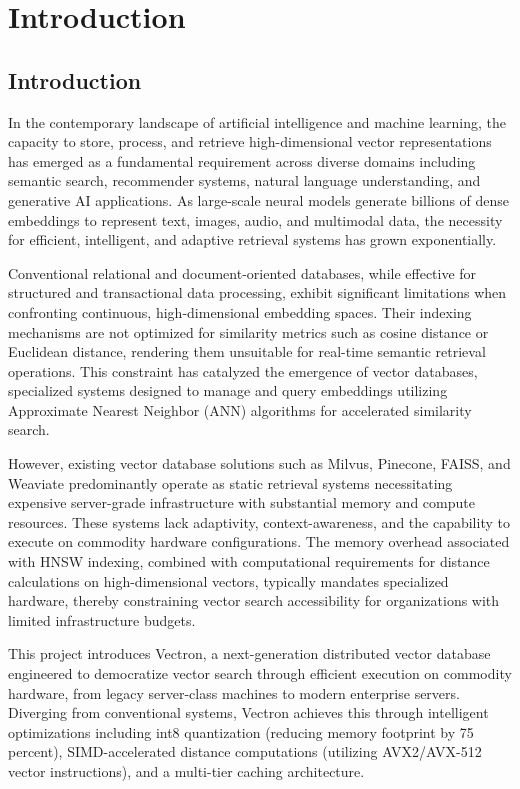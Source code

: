 \chapter{Introduction}

\section{Introduction}

In the contemporary landscape of artificial intelligence and machine learning, the capacity to store, process, and retrieve high-dimensional vector representations has emerged as a fundamental requirement across diverse domains including semantic search, recommender systems, natural language understanding, and generative AI applications. As large-scale neural models generate billions of dense embeddings to represent text, images, audio, and multimodal data, the necessity for efficient, intelligent, and adaptive retrieval systems has grown exponentially.

Conventional relational and document-oriented databases, while effective for structured and transactional data processing, exhibit significant limitations when confronting continuous, high-dimensional embedding spaces. Their indexing mechanisms are not optimized for similarity metrics such as cosine distance or Euclidean distance, rendering them unsuitable for real-time semantic retrieval operations. This constraint has catalyzed the emergence of vector databases, specialized systems designed to manage and query embeddings utilizing Approximate Nearest Neighbor (ANN) algorithms for accelerated similarity search.

However, existing vector database solutions such as Milvus, Pinecone, FAISS, and Weaviate predominantly operate as static retrieval systems necessitating expensive server-grade infrastructure with substantial memory and compute resources. These systems lack adaptivity, context-awareness, and the capability to execute on commodity hardware configurations. The memory overhead associated with HNSW indexing, combined with computational requirements for distance calculations on high-dimensional vectors, typically mandates specialized hardware, thereby constraining vector search accessibility for organizations with limited infrastructure budgets.

This project introduces Vectron, a next-generation distributed vector database engineered to democratize vector search through efficient execution on commodity hardware, from legacy server-class machines to modern enterprise servers. Diverging from conventional systems, Vectron achieves this through intelligent optimizations including int8 quantization (reducing memory footprint by 75 percent), SIMD-accelerated distance computations (utilizing AVX2/AVX-512 vector instructions), and a multi-tier caching architecture.

